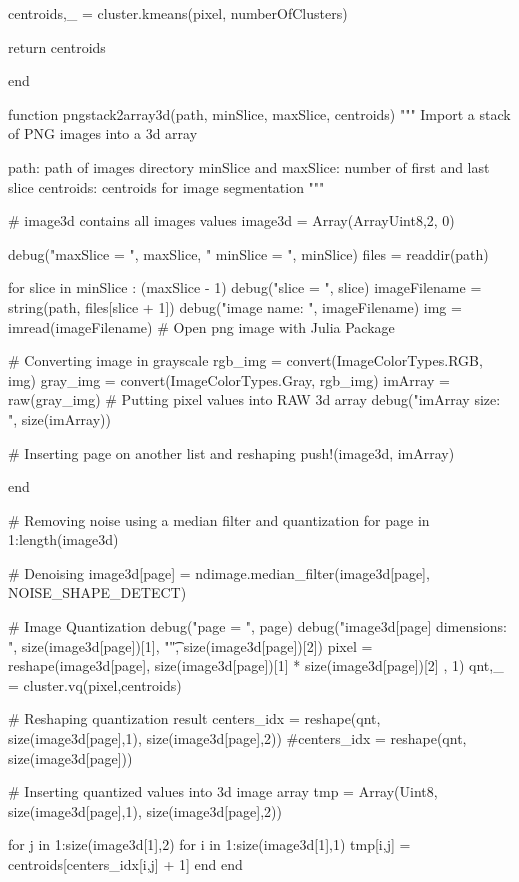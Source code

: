 \documentclass[11pt,oneside]{article}	%
\begin{document}
{  centroids,_ = cluster.kmeans(pixel, numberOfClusters)

  return centroids

end


function pngstack2array3d(path, minSlice, maxSlice, centroids)
  """
  Import a stack of PNG images into a 3d array

  path: path of images directory
  minSlice and maxSlice: number of first and last slice
  centroids: centroids for image segmentation
  """

  # image3d contains all images values
  image3d = Array(Array{Uint8,2}, 0)

  debug("maxSlice = ", maxSlice, " minSlice = ", minSlice)
  files = readdir(path)

  for slice in minSlice : (maxSlice - 1)
    debug("slice = ", slice)
    imageFilename = string(path, files[slice + 1])
    debug("image name: ", imageFilename)
    img = imread(imageFilename) # Open png image with Julia Package

    # Converting image in grayscale
    rgb_img = convert(Image{ColorTypes.RGB}, img)
    gray_img = convert(Image{ColorTypes.Gray}, rgb_img)
    imArray = raw(gray_img) # Putting pixel values into RAW 3d array
    debug("imArray size: ", size(imArray))

    # Inserting page on another list and reshaping
    push!(image3d, imArray)

  end

  # Removing noise using a median filter and quantization
  for page in 1:length(image3d)

    # Denoising
    image3d[page] = ndimage.median_filter(image3d[page], NOISE_SHAPE_DETECT)

    # Image Quantization
    debug("page = ", page)
    debug("image3d[page] dimensions: ", size(image3d[page])[1], "\t", size(image3d[page])[2])
    pixel = reshape(image3d[page], size(image3d[page])[1] * size(image3d[page])[2] , 1)
    qnt,_ = cluster.vq(pixel,centroids)

    # Reshaping quantization result
    centers_idx = reshape(qnt, size(image3d[page],1), size(image3d[page],2))
    #centers_idx = reshape(qnt, size(image3d[page]))

    # Inserting quantized values into 3d image array
    tmp = Array(Uint8, size(image3d[page],1), size(image3d[page],2))

    for j in 1:size(image3d[1],2)
      for i in 1:size(image3d[1],1)
        tmp[i,j] = centroids[centers_idx[i,j] + 1]
      end
    end

}
\end{document}
